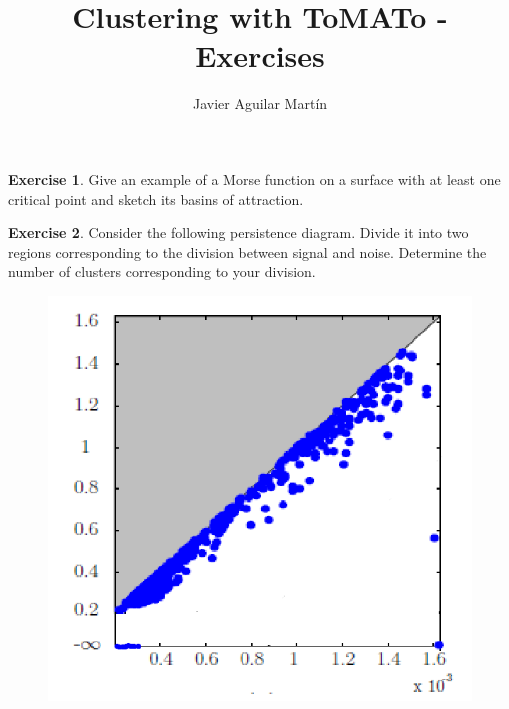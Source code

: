 \documentclass{article}
\theoremstyle{plain}
\theoremstyle{definition}
\newtheorem{exercise}{Exercise}
\begin{document}
\title{Clustering with ToMATo - Exercises }
\author{Javier Aguilar Martín}
\date{}
\maketitle
\begin{exercise}
Give an example of a Morse function on a surface with at least one critical point and sketch its basins of attraction.
\end{exercise}

\begin{exercise}
Consider the following persistence diagram. Divide it into two regions corresponding to the division between signal and noise. Determine the number of clusters corresponding to your division.
\begin{figure}[h!]
\centering
\includegraphics[scale=0.4]{diagramex}
\end{figure}
\end{exercise}
\end{document}
